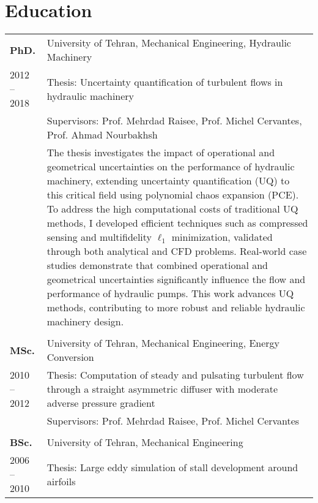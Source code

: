 

\section{Education}{}

\begin{tabularx}{\textwidth}{l X}
    \textbf{PhD.} & University of Tehran, Mechanical Engineering, Hydraulic Machinery \\
    2012 -- 2018 & Thesis: Uncertainty quantification of turbulent flows in hydraulic machinery \\
    & Supervisors: Prof. Mehrdad Raisee, Prof. Michel Cervantes, Prof. Ahmad Nourbakhsh\\
    & The thesis investigates the impact of operational and geometrical uncertainties on the performance of hydraulic machinery, extending uncertainty quantification (UQ) to this critical field using polynomial chaos expansion (PCE). To address the high computational costs of traditional UQ methods, I developed efficient techniques such as compressed sensing and multifidelity $\ell_1$ minimization, validated through both analytical and CFD problems. Real-world case studies demonstrate that combined operational and geometrical uncertainties significantly influence the flow and performance of hydraulic pumps. This work advances UQ methods, contributing to more robust and reliable hydraulic machinery design.\\
    \multicolumn{2}{c}{} \\
    \textbf{MSc.} & University of Tehran, Mechanical Engineering, Energy Conversion \\
    2010 -- 2012 & Thesis: Computation of steady and pulsating turbulent flow through a straight asymmetric diffuser with moderate adverse pressure gradient \\
    & Supervisors: Prof. Mehrdad Raisee, Prof. Michel Cervantes\\
    
    \multicolumn{2}{c}{} \\
    \textbf{BSc.} & University of Tehran, Mechanical Engineering \\
    2006 -- 2010 & Thesis: Large eddy simulation of stall development around airfoils \\
\end{tabularx}

